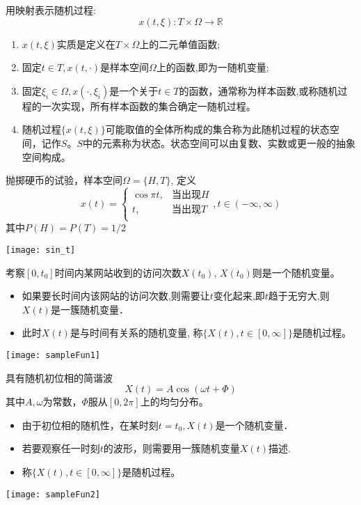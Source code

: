 \begin{frame}
用映射表示随机过程: 
\[x(t,\xi): T\times\Omega\to\mathbb{R} \]
\begin{enumerate}
	\item $x(t,\xi)$实质是定义在$T\times\Omega$上的二元单值函数;
	\item 固定$t\in T,x(t,\cdot)$是样本空间$\Omega$上的函数,即为一随机变量;
	\item 固定$\xi_i\in\Omega,x(\cdot,\xi_i)$是一个关于$t\in T$的函数，通常称为样本函数,或称随机过程的一次实现，所有样本函数的集合确定一随机过程。
	\item 随机过程$\{x(t,\xi)\}$可能取值的全体所构成的集合称为此随机过程的状态空间，记作$S$。$S$中的元素称为状态。状态空间可以由复数、实数或更一般的抽象空间构成。
\end{enumerate}
\end{frame}

\begin{frame}
\begin{example}[随机过程示例]
	抛掷硬币的试验，样本空间$\Omega=\{H,T\}$, 定义
	\[x(t)=\begin{cases}
	\cos\pi t, &\text{当出现$H$}\\
	t, &\text{当出现$T$}\\ 
	\end{cases}, t\in(-\infty,\infty)\]
	其中$P(H)=P(T)=1/2$
\end{example}
\texttt{[image: sin\_t]}
\end{frame}

\begin{frame}
\begin{example}
	考察$[0,t_0]$时间内某网站收到的访问次数$X(t_0)$, $X(t_0)$则是一个随机变量。
	\begin{itemize}
		\item 如果要长时间内该网站的访问次数,则需要让$t$变化起来,即$t$趋于无穷大,则$X(t)$是一簇随机变量．
		\item 此时$X(t)$是与时间有关系的随机变量, 称$\{X(t),t\in[0,\infty]\}$是随机过程。
	\end{itemize}
\end{example}
\texttt{[image: sampleFun1]}	
\end{frame}

\begin{frame}
\begin{example}
具有随机初位相的简谐波
\[X(t)=A\cos(\omega t+\Phi)\]
其中$A,\omega$为常数，$\Phi$服从$[0,2\pi]$上的均匀分布。
\begin{itemize}
	\item 由于初位相的随机性，在某时刻$t=t_0,X(t)$是一个随机变量．
	\item 若要观察任一时刻$t$的波形，则需要用一簇随机变量$X(t)$描述. 
	\item 称$\{X(t),t\in[0,\infty]\}$是随机过程。
\end{itemize}	
\end{example}
\texttt{[image: sampleFun2]}	
\end{frame}

